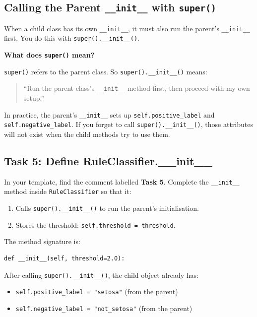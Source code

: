 \subsection{Calling the Parent \texttt{\_\_init\_\_} with \texttt{super()}}

When a child class has its own \texttt{\_\_init\_\_}, it must also run the parent's \texttt{\_\_init\_\_} first.
You do this with \texttt{super().\_\_init\_\_()}.

\medskip
\noindent
\textbf{What does \texttt{super()} mean?}

\medskip
\noindent
\texttt{super()} refers to the parent class.
So \texttt{super().\_\_init\_\_()} means:
\begin{quote}
``Run the parent class's \texttt{\_\_init\_\_} method first, then proceed with my own setup.''
\end{quote}

\noindent
In practice, the parent's \texttt{\_\_init\_\_} sets up \texttt{self.positive\_label} and \texttt{self.negative\_label}.
If you forget to call \texttt{super().\_\_init\_\_()}, those attributes will not exist when the child methods try to use them.

\subsection{Task 5: Define RuleClassifier.\_\_init\_\_}

\begin{tcolorbox}[title=Task 5: Define RuleClassifier.\_\_init\_\_]
In your template, find the comment labelled \textbf{Task 5}.
Complete the \texttt{\_\_init\_\_} method inside \texttt{RuleClassifier} so that it:
\begin{enumerate}
    \item Calls \texttt{super().\_\_init\_\_()} to run the parent's initialisation.
    \item Stores the threshold: \texttt{self.threshold = threshold}.
\end{enumerate}

\medskip
The method signature is:
\begin{verbatim}
def __init__(self, threshold=2.0):
\end{verbatim}
\end{tcolorbox}

\noindent
After calling \texttt{super().\_\_init\_\_()}, the child object already has:
\begin{itemize}
    \item \texttt{self.positive\_label = "setosa"} (from the parent)
    \item \texttt{self.negative\_label = "not\_setosa"} (from the parent)
\end{itemize}

